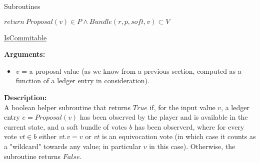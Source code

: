 \documentclass[10pt,a4paper]{article}
\begin{document}
\begin{section}{Subroutines}\label{sect:soubroutines}

\begin{algorithm}[H]
    \begin{algorithmic}[1]

    \State $return \ Proposal(v) \in P \land Bundle(r,p,soft,v) \subset V$

    \EndFunction
    \end{algorithmic}
    \caption{\underline{IsCommitable}}
\end{algorithm}


\noindent \textbf{Arguments:}
\begin{itemize}
    \item $v$ = a proposal value (as we know from a previous section, computed as a function of a ledger entry in consideration).
  \end{itemize}

\noindent \textbf{Description:}\\
A boolean helper subroutine that returns $True$ if, for the input value $v$,
a ledger entry $e = Proposal(v)$ has been observed by the player and is available in the current state,
and a soft bundle of votes $b$ has been observerd, where for every vote $vt \in b$ 
either $vt.v = v$ or $vt$ is an equivocation vote (in which case it counts as a "wildcard" towards 
any value; in particular $v$ in this case). Otherwise, the subroutine returns $False$.





\end{section}
\end{document}
